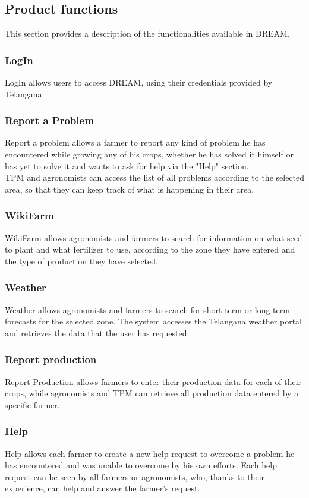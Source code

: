 \subsection{Product functions}
This section provides a description of the functionalities available in DREAM.
\subsubsection{LogIn}
LogIn allows users to access DREAM, using their credentials provided by Telangana.

\subsubsection{Report a Problem}
Report a problem allows a farmer to report any kind of problem he has encountered while growing any of his crops, whether he has solved it himself or has yet to solve it and wants to ask for help via the "Help" section.\\
TPM and agronomists can access the list of all problems according to the selected area, so that they can keep track of what is happening in their area.

\subsubsection{WikiFarm}
WikiFarm allows agronomists and farmers to search for information on what seed to plant and what fertilizer to use, according to the zone they have entered and the type of production they have selected.

\subsubsection{Weather}
Weather allows agronomists and farmers to search for short-term or long-term forecasts for the selected zone. The system accesses the Telangana weather portal and retrieves the data that the user has requested.

\subsubsection{Report production}
Report Production allows farmers to enter their production data for each of their crops, while agronomists and TPM can retrieve all production data entered by a specific farmer.

\subsubsection{Help}
Help allows each farmer to create a new help request to overcome a problem he has encountered and was unable to overcome by his own efforts. Each help request can be seen by all farmers or agronomists, who, thanks to their experience, can help and answer the farmer's request.

